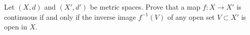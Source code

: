 Let $(X,d)$ and $(X',d')$ be metric spaces. Prove that a map $f:X\to X'$ is continuous if and only if the inverse image $f^{-1}(V)$ of any open set $V\subset X'$ is open in $X$.

